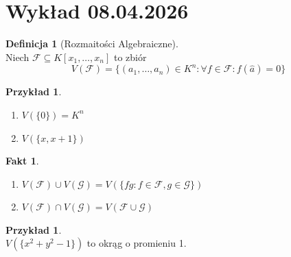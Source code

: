 \documentclass[11pt,a4paper]{article}
\newtheorem{fakt}[twierdzenie]{Fakt}
\theoremstyle{definition}
\newtheorem{definicja}[twierdzenie]{Definicja}
\newtheorem{przyklad}[twierdzenie]{Przykład}
\theoremstyle{remark}
\begin{document}
\section{Wykład 08.04.2026}
\begin{definicja}[Rozmaitości Algebraiczne]~\\
    Niech $\mathcal{F} \subseteq K[x_1,\dots,x_n]$ to zbiór 
    \[
        V(\mathcal{F}) = \{ (a_1, \dots, a_n)\in K^n: \forall f \in \mathcal{F}: f(\hat{a})=0\}
    \]
\end{definicja}
\begin{przyklad}
    \begin{enumerate}
        \item $V(\{0\}) = K^n$
        \item $ V(\{x, x+1\})$
    \end{enumerate}
\end{przyklad}
\begin{fakt}
    \begin{enumerate}
        \item $V(\mathcal{F}) \cup V(\mathcal{G}) = V(\{fg: f \in \mathcal{F}, g \in \mathcal{G}\})$
        \item $V(\mathcal{F}) \cap V(\mathcal{G}) = V(\mathcal{F} \cup \mathcal{G})$
    \end{enumerate}
\end{fakt}
\begin{przyklad}~\\
    $V(\{x^2 + y^2 - 1\})$ to okrąg o promieniu 1.
\end{przyklad}
\end{document}
